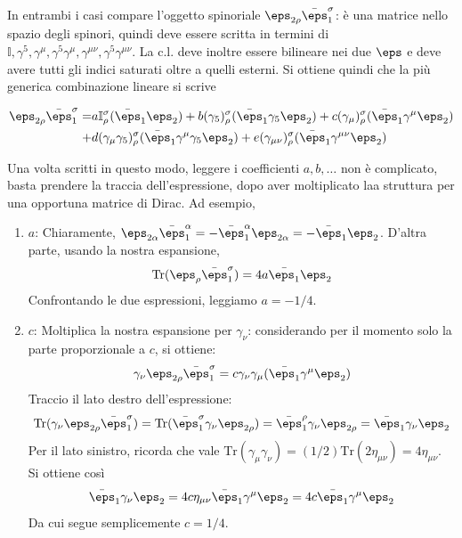 \documentclass{report}
\begin{document}
In entrambi i casi compare l'oggetto spinoriale \(\eps_{2\rho}\bar{\eps}_1^\sigma\): è una matrice nello spazio degli spinori, quindi deve essere scritta in termini di \(\mathbb{I}, \gamma^5, \gamma^\mu, \gamma^5\gamma^\mu, \gamma^{\mu\nu}, \gamma^5\gamma^{\mu\nu}\). La c.l. deve inoltre essere bilineare nei due \(\eps\) e deve avere tutti gli indici saturati oltre a quelli esterni. Si ottiene quindi che la più generica combinazione lineare si scrive 

\begin{align}
    \eps_{2\rho}\bar{\eps}_1^\sigma = &a \mathbb{I}_\rho^\sigma (\bar{\eps}_1 \eps_2) + b(\gamma_5)_\rho^\sigma (\bar{\eps}_1 \gamma_5 \eps_2) + c(\gamma_\mu)_\rho^\sigma (\bar{\eps}_1 \gamma^\mu \eps_2) \notag \\ 
    +&d (\gamma_\mu\gamma_5)^\sigma_\rho (\bar{\eps}_1\gamma^\mu \gamma_5 \eps_2) + e(\gamma_{\mu\nu})^\sigma_\rho (\bar{\eps}_1 \gamma^{\mu\nu} \eps_2)
\end{align}

Una volta scritti in questo modo, leggere i coefficienti \(a, b, \ldots\) non è complicato, basta prendere la traccia dell'espressione, dopo aver moltiplicato laa struttura per una opportuna matrice di Dirac. Ad esempio, 

\begin{enumerate}
    \item \(a\): Chiaramente, \(\eps_{2\alpha}\bar{\eps}_1^\alpha = -\bar{\eps}_1^\alpha \eps_{2\alpha} = -\bar{\eps}_1 \eps_2\). D'altra parte, usando la nostra espansione, 
    \begin{align}
        \text{Tr}(\eps_\rho \bar{\eps}_1^\sigma) = 4a \bar{\eps_1}\eps_2
    \end{align}
    Confrontando le due espressioni, leggiamo \(a = -1/4\). 
    \item \(c\): Moltiplica la nostra espansione per \(\gamma_\nu\): considerando per il momento solo la parte proporzionale a \(c\), si ottiene: 
    \begin{align}
        \gamma_\nu \eps_{2\rho} \bar{\eps}_1^\sigma = c\gamma_\nu \gamma_\mu (\bar{\eps_1}\gamma^\mu \eps_2)
    \end{align}
    Traccio il lato destro dell'espressione: 
    \begin{align}
       \text{Tr}(\gamma_\nu \eps_{2\rho}\bar{\eps}_1^\sigma) = \text{Tr}(\bar{\eps}_1^\sigma \gamma_\nu \eps_{2\rho}) = \bar{\eps}_1^\rho \gamma_\nu \eps_{2\rho} = \bar{\eps}_1 \gamma_\nu \eps_2
    \end{align}
    Per il lato sinistro, ricorda che vale \(\text{Tr}(\gamma_\mu\gamma_\nu) = (1/2)\text{Tr}(2\eta_{\mu\nu}) = 4\eta_{\mu\nu}\). Si ottiene così 
    \begin{align}
        \bar{\eps}_1 \gamma_\nu \eps_2 = 4c\eta_{\mu\nu}\bar{\eps}_1 \gamma^\mu \eps_2 = 4c \bar{\eps_1}\gamma^\mu \eps_2
    \end{align}
    Da cui segue semplicemente \(c = 1/4\). 
\end{enumerate}
\end{document}
